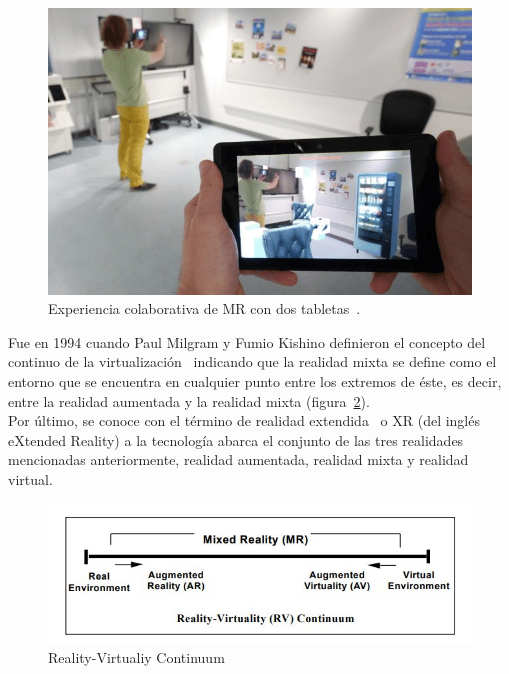\begin{figure}[H]
    \centering
    \includegraphics[scale=0.3]{Images/Estado del arte/mrexampledefinition.png}
    \caption{Experiencia colaborativa de MR con dos tabletas~\cite{mrExampleDefinition}.}
    \label{fig:mrdefinitionexample}
\end{figure}

Fue en 1994 cuando Paul Milgram y Fumio Kishino definieron el concepto del continuo de la virtualización~\cite{ARDisplayofContinuum} indicando que la realidad mixta se define como el entorno que se encuentra en cualquier punto entre los extremos de éste, es decir, entre la realidad aumentada y la realidad mixta (figura~\ref{fig:rvcontinuumfig}).\\

Por último, se conoce con el término de realidad extendida~\cite{xrintro} o XR (del inglés eXtended Reality) a la tecnología abarca el conjunto de las tres realidades mencionadas anteriormente, realidad aumentada, realidad mixta y realidad virtual.  

\begin{figure}[H]
    \centering
    \includegraphics[scale=0.85]{Images/Estado del arte/rvcontinuum.JPG}
    \caption{Reality-Virtualiy Continuum \cite{ARDisplayofContinuum}}
    \label{fig:rvcontinuumfig}
\end{figure}






